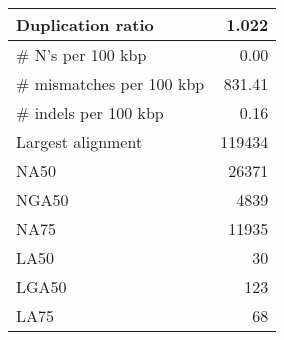 \documentclass[12pt,a4paper]{article}
\begin{document}
\begin{table}[ht]
\begin{center}
\begin{tabular}{|l*{1}{|r}|}
Duplication ratio & 1.022 \\ \hline
\# N's per 100 kbp & 0.00 \\ \hline
\# mismatches per 100 kbp & 831.41 \\ \hline
\# indels per 100 kbp & 0.16 \\ \hline
Largest alignment & 119434 \\ \hline
NA50 & 26371 \\ \hline
NGA50 & 4839 \\ \hline
NA75 & 11935 \\ \hline
LA50 & 30 \\ \hline
LGA50 & 123 \\ \hline
LA75 & 68 \\ \hline
\end{tabular}
\end{center}
\end{table}
\end{document}
